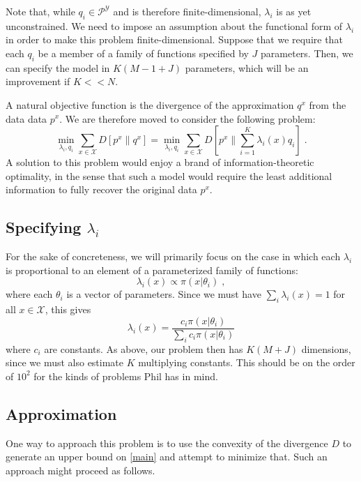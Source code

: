 \documentclass[english]{scrartcl}
\begin{document}
		Note that, while $q_i \in \mathcal{P}^{\mathcal{Y}}$ and is therefore finite-dimensional, $\lambda_i$ is as yet unconstrained. We need to impose an assumption about the functional form of $\lambda_i$ in order to make this problem finite-dimensional. Suppose that we require that each $q_i$ be a member of a family of functions specified by $J$ parameters. Then, we can specify the model in $K(M-1 + J)$ parameters, which will be an improvement if $K << N$. 

		A natural objective function is the divergence of the approximation $q^x$ from the data data $p^x$. We are therefore moved to consider the following problem: 
		\begin{equation}
			\min_{\lambda_i, q_i} \sum_{x \in \mathcal{X}} D[p^x\|q^x] = \min_{\lambda_i, q_i} \sum_{x \in \mathcal{X}} D\left[p^x\bigg\|\sum_{i=1}^K \lambda_i(x) q_i\right]\;. \label{main}
		\end{equation}
		A solution to this problem would enjoy a brand of information-theoretic optimality, in the sense that such a model would require the least additional information to fully recover the original data $p^x$. 

	\subsection{Specifying $\lambda_i$}
		For the sake of concreteness, we will primarily focus on the case in which each $\lambda_i$ is proportional to an element of a parameterized family of functions: 
		\begin{equation}
			\lambda_i(x) \propto \pi(x|\theta_i)\;,
		\end{equation}
		where each $\theta_i$ is a vector of parameters. Since we must have $\sum_i \lambda_i(x) = 1$ for all $x\in \mathcal{X}$, this gives 
		\begin{equation}
			\lambda_i(x) = \frac{c_i\pi(x|\theta_i)}{\sum_ic_i\pi(x|\theta_i)}
		\end{equation}
		where $c_i$ are constants. As above, our problem then has $K(M+J)$ dimensions, since we must also estimate $K$ multiplying constants. This  should be on the order of $10^2$ for the kinds of problems Phil has in mind. 
	\subsection{Approximation}
		One way to approach this problem is to use the convexity of the divergence $D$ to generate an upper bound on \eqref{main} and attempt to minimize that. Such an approach might proceed as follows. 
\end{document}

